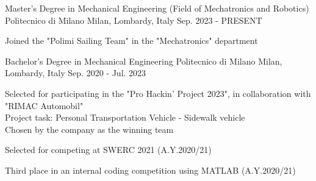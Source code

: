 

\begin{cventries}

  \cventry
  {Master's Degree in Mechanical Engineering (Field of Mechatronics and Robotics)} %
  {Politecnico di Milano} %
  {Milan, Lombardy, Italy} %
  {Sep. 2023 - PRESENT} %
  {
    \begin{cvitems} %
      \item {Joined the "Polimi Sailing Team" in the "Mechatronics" department}
    \end{cvitems}
  }




  \cventry
  {Bachelor's Degree in Mechanical Engineering} %
  {Politecnico di Milano} %
  {Milan, Lombardy, Italy} %
  {Sep. 2020 - Jul. 2023} %
  {
    \begin{cvitems} %
      \item {Selected for participating in the "Pro Hackin' Project 2023", in collaboration with "RIMAC Automobil"\\
                  Project task: Personal Transportation Vehicle - Sidewalk vehicle\\
                  Chosen by the company as the winning team}
      \item {Selected for competing at SWERC 2021 (A.Y.2020/21)}
      \item {Third place in an internal coding competition using MATLAB (A.Y.2020/21)}
    \end{cvitems}
  }


\end{cventries}
